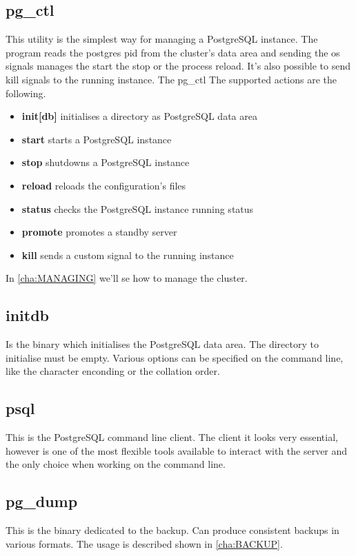 \subsection{pg\_ctl}
\label{sub:PGCTL}
This utility is the simplest way for managing a PostgreSQL instance. The program reads the postgres 
pid from the cluster's data area and sending the os signals manages the start the stop or the 
process reload. It's also possible to send kill signals to the running instance. 
The pg\_ctl The supported actions are the following.

\begin{itemize}
 \item \textbf{init[db]} initialises a directory as PostgreSQL data area
 \item \textbf{start} starts a PostgreSQL instance
 \item \textbf{stop} shutdowns a PostgreSQL instance
 \item \textbf{reload} reloads the configuration's files
 \item \textbf{status} checks the PostgreSQL instance running status
 \item \textbf{promote} promotes a standby server 
 \item \textbf{kill} sends a custom signal to the running instance
\end{itemize}

In \ref{cha:MANAGING} we'll se how to manage the cluster.

\subsection{initdb}
Is the binary which initialises the PostgreSQL data area. The directory to initialise must 
be empty. Various options can be specified on the command line, like the character enconding or the 
collation order. 

\subsection{psql}
This is the PostgreSQL command line client. The client it looks very essential, however is one of 
the most flexible tools available to interact with the server and the only choice when working on 
the command line.

\subsection{pg\_dump}
\label{sub:PGDUMP}
This is the binary dedicated to the backup. Can produce consistent backups in various formats. The 
usage is described shown in \ref{cha:BACKUP}.

